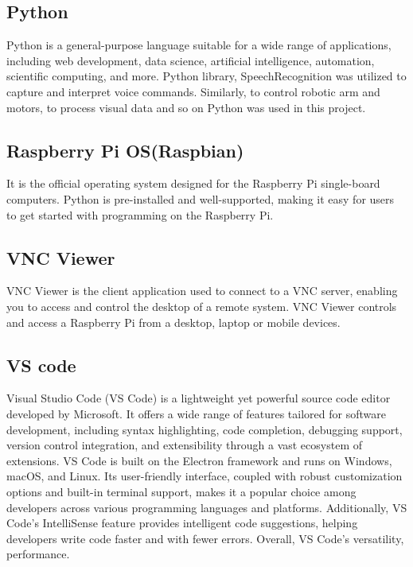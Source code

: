 \subsection{Python}
Python is a general-purpose language suitable for a wide range of applications, including web development, data science, artificial intelligence, automation, scientific computing, and more. Python library, SpeechRecognition was utilized to capture and interpret voice commands. Similarly, to control robotic arm and motors, to process visual data and so on Python was used in this project.
\subsection{Raspberry Pi OS(Raspbian)}
It is the official operating system designed for the Raspberry Pi single-board computers. Python is pre-installed and well-supported, making it easy for users to get started with programming on the Raspberry Pi.
\subsection{VNC Viewer}
VNC Viewer is the client application used to connect to a VNC server, enabling you to access and control the desktop of a remote system. VNC Viewer controls and access a Raspberry Pi from a desktop, laptop or mobile devices.
\subsection{VS code}
Visual Studio Code (VS Code) is a lightweight yet powerful source code editor developed by Microsoft. It offers a wide range of features tailored for software development, including syntax highlighting, code completion, debugging support, version control integration, and extensibility through a vast ecosystem of extensions. VS Code is built on the Electron framework and runs on Windows, macOS, and Linux. Its user-friendly interface, coupled with robust customization options and built-in terminal support, makes it a popular choice among developers across various programming languages and platforms. Additionally, VS Code's IntelliSense feature provides intelligent code suggestions, helping developers write code faster and with fewer errors. Overall, VS Code's versatility, performance.
